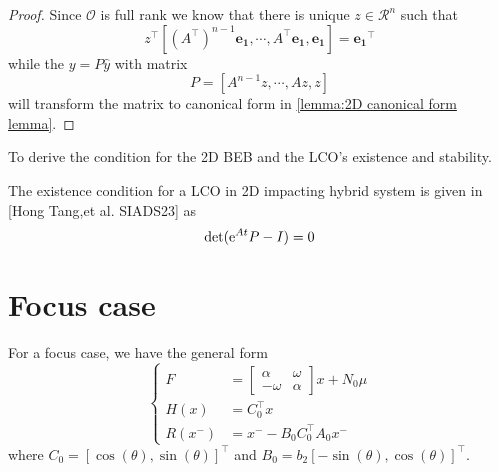 \documentclass{article}
\newtheorem{proof}{Proof}[theorem]
\begin{document}
\begin{proof}
	Since $\mathcal{O}$ is full rank we know that  there is unique $z \in \mathcal{R}^n$ such that 
	$$
	z^{\top} [(A^{\top})^{n-1}\mathbf{e_1}, \cdots, A^{\top}\mathbf{e_1}, \mathbf{e_1}] = \mathbf{e_1}^{\top}
	$$ 
	while the $y = P\hat{y}$ with matrix 
	\[
	P = [A^{n-1} z , \cdots, Az, z]
	\]
	will transform the matrix to canonical form in \cref{lemma:2D canonical form lemma}.
\end{proof}
To derive the condition for the 2D BEB and the LCO's existence and stability. 

The existence condition for a LCO in 2D impacting hybrid system is given in [Hong Tang,et al. SIADS23] as
\begin{equation}
	 \operatorname{det}({\rm e}^{A t} P - I ) =0
	 \label{eq:det_condition}
\end{equation}

\section{Focus case}
For a focus case, we have the general form 
\begin{equation}
	\begin{cases}
		F &= \begin{bmatrix}
			\alpha & \omega
			 \\
			-\omega & \alpha
		    \end{bmatrix} x + N_0 \mu
	  \\
	  H(x) &= C_0^{\top}x  
	  \\
	  R(x^-) &= x^- - B_0 C_0^{\top}A_0x^-
	\end{cases}
\end{equation}
where 
$C_0 = [\cos(\theta), \sin(\theta)]^{\top}$ 
and 
$B_0 = b_2 [-\sin(\theta), \cos(\theta)]^{\top}$.
\end{document}
